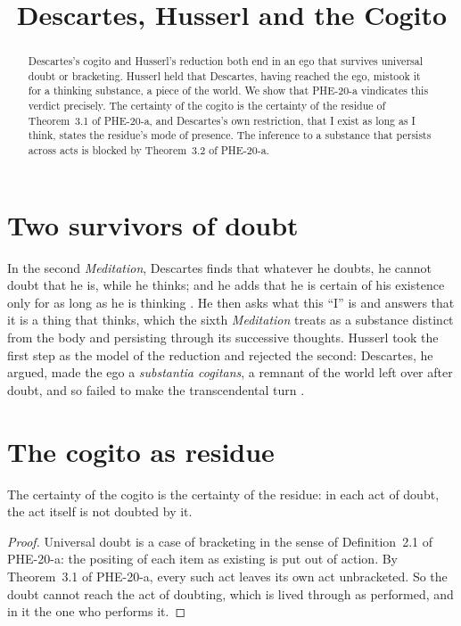 \documentclass{situationist-preprint}
\title{Descartes, Husserl and the Cogito}
\begin{document}
\maketitle

\begin{abstract}
Descartes's cogito and Husserl's reduction both end in an ego that survives universal doubt or bracketing. Husserl held that Descartes, having reached the ego, mistook it for a thinking substance, a piece of the world. We show that PHE-20-a vindicates this verdict precisely. The certainty of the cogito is the certainty of the residue of Theorem~3.1 of PHE-20-a, and Descartes's own restriction, that I exist as long as I think, states the residue's mode of presence. The inference to a substance that persists across acts is blocked by Theorem~3.2 of PHE-20-a.
\end{abstract}

\section{Two survivors of doubt}

In the second \emph{Meditation}, Descartes finds that whatever he doubts, he cannot doubt that he is, while he thinks; and he adds that he is certain of his existence only for as long as he is thinking \citep{Descartes1641}. He then asks what this \enquote{I} is and answers that it is a thing that thinks, which the sixth \emph{Meditation} treats as a substance distinct from the body and persisting through its successive thoughts. Husserl took the first step as the model of the reduction and rejected the second: Descartes, he argued, made the ego a \emph{substantia cogitans}, a remnant of the world left over after doubt, and so failed to make the transcendental turn \citep[§10]{Husserl1950}.

\section{The cogito as residue}

\begin{proposition}\label{p:certain}
The certainty of the cogito is the certainty of the residue: in each act of doubt, the act itself is not doubted by it.
\end{proposition}

\begin{proof}
Universal doubt is a case of bracketing in the sense of Definition~2.1 of PHE-20-a: the positing of each item as existing is put out of action. By Theorem~3.1 of PHE-20-a, every such act leaves its own act unbracketed. So the doubt cannot reach the act of doubting, which is lived through as performed, and in it the one who performs it.
\end{proof}
\end{document}
